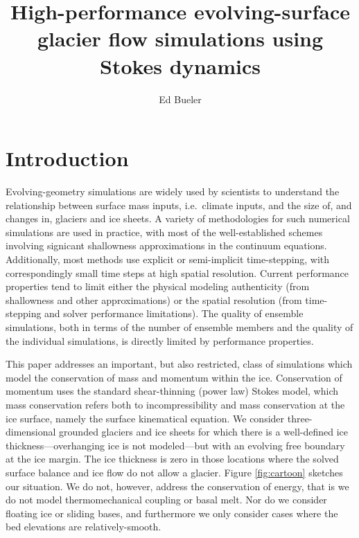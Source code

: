 \documentclass[letterpaper,final,12pt,reqno]{amsart}
\begin{document}
\title{High-performance evolving-surface glacier flow simulations using Stokes dynamics}

\author{Ed Bueler}

\maketitle

\thispagestyle{empty}
\bigskip

\section{Introduction} \label{sec:intro}

Evolving-geometry simulations are widely used by scientists to understand the relationship between surface mass inputs, i.e.~climate inputs, and the size of, and changes in, glaciers and ice sheets.  A variety of methodologies for such numerical simulations are used in practice, with most of the well-established schemes involving signicant shallowness approximations in the continuum equations.  Additionally, most methods use explicit or semi-implicit time-stepping, with correspondingly small time steps at high spatial resolution.  Current performance properties tend to limit either the physical modeling authenticity (from shallowness and other approximations) or the spatial resolution (from time-stepping and solver performance limitations).  The quality of ensemble simulations, both in terms of the number of ensemble members and the quality of the individual simulations, is directly limited by performance properties.

This paper addresses an important, but also restricted, class of simulations which model the conservation of mass and momentum within the ice.  Conservation of momentum uses the standard shear-thinning (power law) Stokes model, which mass conservation refers both to incompressibility and mass conservation at the ice surface, namely the surface kinematical equation.  We consider three-dimensional grounded glaciers and ice sheets for which there is a well-defined ice thickness---overhanging ice is not modeled---but with an evolving free boundary at the ice margin.  The ice thickness is zero in those locations where the solved surface balance and ice flow do not allow a glacier.  Figure \ref{fig:cartoon} sketches our situation.  We do not, however, address the conservation of energy, that is we do not model thermomechanical coupling or basal melt.  Nor do we consider floating ice or sliding bases, and furthermore we only consider cases where the bed elevations are relatively-smooth.
\end{document}
